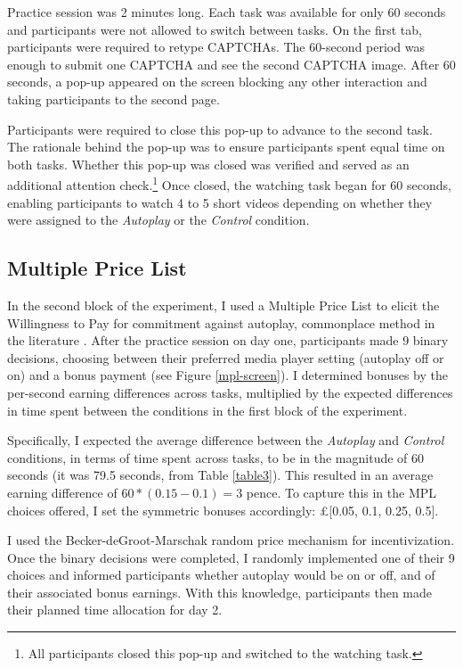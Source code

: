 \documentclass[11pt,a4paper,oneside]{article}
\begin{document}
Practice session was 2 minutes long. Each task was available for only 60 seconds and participants were not allowed to switch between tasks. On the first tab, participants were required to retype CAPTCHAs. The 60-second period was enough to submit one CAPTCHA and see the second CAPTCHA image. After 60 seconds, a pop-up appeared on the screen blocking any other interaction and taking participants to the second page.

Participants were required to close this pop-up to advance to the second task. The rationale behind the pop-up was to ensure participants spent equal time on both tasks. Whether this pop-up was closed was verified and served as an additional attention check.\footnote{All participants closed this pop-up and switched to the watching task.} Once closed, the watching task began for 60 seconds, enabling participants to watch 4 to 5 short videos depending on whether they were assigned to the \textit{Autoplay} or the \textit{Control} condition.

\subsection{Multiple Price List}\label{mpl}
In the second block of the experiment, I used a Multiple Price List to elicit the Willingness to Pay for commitment against autoplay, commonplace method in the literature \citep{andersenElicitationUsingMultiple2006,jackMultiplePriceLists2022}. After the practice session on day one, participants made 9 binary decisions, choosing between their preferred media player setting (autoplay off or on) and a bonus payment (see Figure \ref{mpl-screen}). I determined bonuses by the per-second earning differences across tasks, multiplied by the expected differences in time spent between the conditions in the first block of the experiment.

Specifically, I expected the average difference between the \textit{Autoplay} and \textit{Control} conditions, in terms of time spent across tasks, to be in the magnitude of 60 seconds (it was 79.5 seconds, from Table \ref{table3}). This resulted in an average earning difference of $60*(0.15-0.1)=3$ pence. To capture this in the MPL choices offered, I set the symmetric bonuses accordingly: £[0.05, 0.1, 0.25, 0.5].

I used the Becker-deGroot-Marschak \citep{beckerMeasuringUtilitySingleresponse1964} random price mechanism for incentivization. 
Once the binary decisions were completed, I randomly implemented one of their 9 choices and informed participants whether autoplay would be on or off, and of their associated bonus earnings. With this knowledge, participants then made their planned time allocation for day 2.
\end{document}
